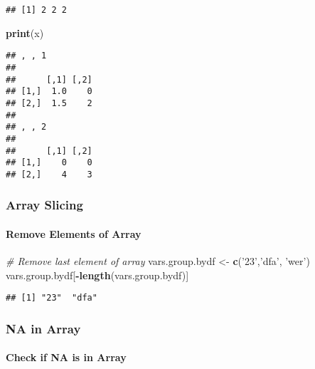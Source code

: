 \documentclass[
]{book}
\newenvironment{Shaded}{\begin{snugshade}}{\end{snugshade}}
\newcommand{\CommentTok}[1]{\textcolor[rgb]{0.56,0.35,0.01}{\textit{#1}}}
\newcommand{\KeywordTok}[1]{\textcolor[rgb]{0.13,0.29,0.53}{\textbf{#1}}}
\newcommand{\NormalTok}[1]{#1}
\newcommand{\OperatorTok}[1]{\textcolor[rgb]{0.81,0.36,0.00}{\textbf{#1}}}
\newcommand{\StringTok}[1]{\textcolor[rgb]{0.31,0.60,0.02}{#1}}
\begin{document}
\begin{verbatim}
## [1] 2 2 2
\end{verbatim}

\begin{Shaded}
\begin{Highlighting}[]
\KeywordTok{print}\NormalTok{(x)}
\end{Highlighting}
\end{Shaded}

\begin{verbatim}
## , , 1
## 
##      [,1] [,2]
## [1,]  1.0    0
## [2,]  1.5    2
## 
## , , 2
## 
##      [,1] [,2]
## [1,]    0    0
## [2,]    4    3
\end{verbatim}

\hypertarget{array-slicing}{%
\subsubsection{Array Slicing}\label{array-slicing}}

\hypertarget{remove-elements-of-array}{%
\paragraph{Remove Elements of Array}\label{remove-elements-of-array}}

\begin{Shaded}
\begin{Highlighting}[]
\CommentTok{# Remove last element of array}
\NormalTok{vars.group.bydf <-}\StringTok{ }\KeywordTok{c}\NormalTok{(}\StringTok{'23'}\NormalTok{,}\StringTok{'dfa'}\NormalTok{, }\StringTok{'wer'}\NormalTok{)}
\NormalTok{vars.group.bydf[}\OperatorTok{-}\KeywordTok{length}\NormalTok{(vars.group.bydf)]}
\end{Highlighting}
\end{Shaded}

\begin{verbatim}
## [1] "23"  "dfa"
\end{verbatim}

\hypertarget{na-in-array}{%
\subsubsection{NA in Array}\label{na-in-array}}

\hypertarget{check-if-na-is-in-array}{%
\paragraph{Check if NA is in Array}\label{check-if-na-is-in-array}}
\end{document}
